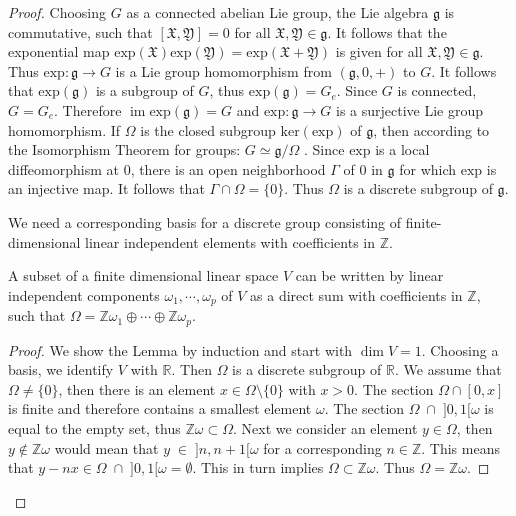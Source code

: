 \documentclass[envcountsect,runningheads]{llncs}
\DeclareMathOperator{\Ima}{im}
\begin{document}
\begin{proof}
Choosing $G$ as a connected abelian Lie group, the Lie algebra $\mathfrak{g}$ is commutative, such that $[\mathfrak{X}, \mathfrak{Y}] = 0$ for all $\mathfrak{X}, \mathfrak{Y} \in \mathfrak{g}$. It follows that the exponential map $\text{exp}(\mathfrak{X})\text{exp}(\mathfrak{Y}) = \text{exp}(\mathfrak{X}+\mathfrak{Y})$ is given for all $\mathfrak{X}, \mathfrak{Y} \in \mathfrak{g}$. Thus $\text{exp}: \mathfrak{g} \rightarrow G$ is a Lie group homomorphism from $(\mathfrak{g},0,+)$ to $G$. It follows that $\text{exp}(\mathfrak{g})$ is a subgroup of $G$, thus $\text{exp}(\mathfrak{g}) = G_e$. Since $G$ is connected, $G = G_e$. Therefore $\Ima \text{exp}(\mathfrak{g}) = G$ and $\text{exp}: \mathfrak{g} \rightarrow G$ is a surjective Lie group homomorphism. If $\Omega$ is the closed subgroup $\text{ker}(\text{exp})$ of $\mathfrak{g}$, then according to the Isomorphism Theorem for groups: $G \simeq \mathfrak{g}/\Omega$ \cite[pp.~5-7]{van2003lie}. Since $\text{exp}$ is a local diffeomorphism at $0$, there is an open neighborhood $\Gamma$ of $0$ in $\mathfrak{g}$ for which $\text{exp}$ is an injective map. It follows that $\Gamma \cap \Omega = \{0\}$. Thus $\Omega$ is a discrete subgroup of $\mathfrak{g}$. 

We need a corresponding basis for a discrete group consisting of finite-dimensional linear independent elements with coefficients in $\mathbb{Z}$.

\begin{lemma}{\cite[p. 27]{van2003lie}}
A subset of a finite dimensional linear space $V$ can be written by linear independent components $\omega_1, \cdots, \omega_p$ of $V$ as a direct sum with coefficients in $\mathbb{Z}$, such that $\Omega = \mathbb{Z}\omega_1 \oplus \cdots \oplus \mathbb{Z}\omega_p$.
\end{lemma}

\begin{proof}
We show the Lemma by induction and start with $\dim V = 1$. Choosing a basis, we identify $V$ with $\mathbb{R}$. Then $\Omega$ is a discrete subgroup of $\mathbb{R}$. We assume that $\Omega \neq \{0\}$, then there is an element $x \in \Omega \setminus \{0\}$ with $x > 0$. The section $\Omega \cap [0,x]$ is finite and therefore contains a smallest element $\omega$. The section $\Omega \; \cap \; ]0,1[\omega$ is equal to the empty set, thus $\mathbb{Z} \omega \subset \Omega$. Next we consider an element $y \in \Omega$, then $y \not\in \mathbb{Z}\omega$ would mean that $y \; \in \; ]n,n+1[\omega$ for a corresponding $n \in \mathbb{Z}$. This means that $y-nx \in \Omega \; \cap \; ]0,1[ \omega = \emptyset$. This in turn implies $\Omega \subset \mathbb{Z}\omega$. Thus $\Omega = \mathbb{Z}\omega$.


\end{proof}
\end{proof}
\end{document}
